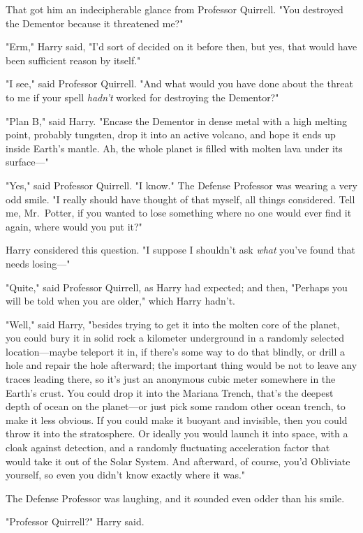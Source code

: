 That got him an indecipherable glance from Professor Quirrell. "You destroyed
the Dementor because it threatened me?"

"Erm," Harry said, "I'd sort of decided on it before then, but yes, that would
have been sufficient reason by itself."

"I see," said Professor Quirrell. "And what would you have done about the
threat to me if your spell \emph{hadn't} worked for destroying the Dementor?"

"Plan B," said Harry. "Encase the Dementor in dense metal with a high melting
point, probably tungsten, drop it into an active volcano, and hope it ends up
inside Earth's mantle. Ah, the whole planet is filled with molten lava under
its surface\mbox{---}"

"Yes," said Professor Quirrell. "I know." The Defense Professor was wearing a
very odd smile. "I really should have thought of that myself, all things
considered. Tell me, Mr.~Potter, if you wanted to lose something where no one
would ever find it again, where would you put it?"

Harry considered this question. "I suppose I shouldn't ask \emph{what} you've
found that needs losing\mbox{---}"

"Quite," said Professor Quirrell, as Harry had expected; and then, "Perhaps you
will be told when you are older," which Harry hadn't.

"Well," said Harry, "besides trying to get it into the molten core of the
planet, you could bury it in solid rock a kilometer underground in a randomly
selected location---maybe teleport it in, if there's some way to do that
blindly, or drill a hole and repair the hole afterward; the important thing
would be not to leave any traces leading there, so it's just an anonymous cubic
meter somewhere in the Earth's crust. You could drop it into the Mariana
Trench, that's the deepest depth of ocean on the planet---or just pick some
random other ocean trench, to make it less obvious. If you could make it
buoyant and invisible, then you could throw it into the stratosphere. Or
ideally you would launch it into space, with a cloak against detection, and a
randomly fluctuating acceleration factor that would take it out of the Solar
System. And afterward, of course, you'd Obliviate yourself, so even you didn't
know exactly where it was."

The Defense Professor was laughing, and it sounded even odder than his smile.

"Professor Quirrell?" Harry said.

